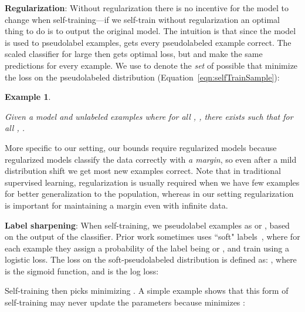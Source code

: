 \documentclass[11pt]{article}
\newtheorem{example}[theorem]{Example}
\newcommand{\pl}[1]{}
\newcommand{\ak}[1]{}
\begin{document}
\textbf{Regularization}:
Without regularization there is no incentive for the model to change when self-training---if we self-train without regularization an optimal thing to do is to output the original model. The intuition is that since the model  is used to pseudolabel examples,  gets every pseudolabeled example correct. The scaled classifier  for large  then gets optimal loss, but  and  make the same predictions for every example. We use  to denote the \emph{set} of possible  that minimize the loss on the pseudolabeled distribution (Equation~\eqref{eqn:selfTrainSample}):

\newcommand{\noRegularizationNoGainText}{
  Given a model\pl{if you use  notation, then you can just say , which is easier to parse anyway}  and unlabeled examples  where for all , , there exists  such that for all , .
}

\begin{example}
\label{ex:noRegularizationNoGain}
\noRegularizationNoGainText{}
\end{example}
\pl{should this really be called an example? I feel like these are more results (propositions?) rather than simple illustrative examples}
\ak{I think they are fairly straightforward? It seems too simple to be a proposition.}

More specific to our setting, our bounds require regularized models because regularized models classify the data correctly with \emph{a margin}, so even after a mild distribution shift we get most new examples correct.
Note that in traditional supervised learning, regularization is usually required when we have few examples for better generalization to the population, whereas in our setting regularization is important for maintaining a margin even with infinite data.

\textbf{Label sharpening}: When self-training, we pseudolabel examples as  or , based on the output of the classifier.
Prior work sometimes uses ``soft" labels~\cite{najafi2019robustness}, where for each example they assign a probability of the label being  or , and train using a logistic loss.
The loss on the soft-pseudolabeled distribution is defined as:
\newcommand{\logL}{\ensuremath{L_{\sigma, \theta}}}
\newcommand{\logl}{\ensuremath{ll}}
,
where  is the sigmoid function, and  is the log loss:

Self-training then picks  minimizing .
A simple example shows that this form of self-training may never update the parameters because  minimizes :

\newcommand{\softLabelsBadText}{
For all ,  is a minimizer of , that is, for all , .

}
\end{document}
